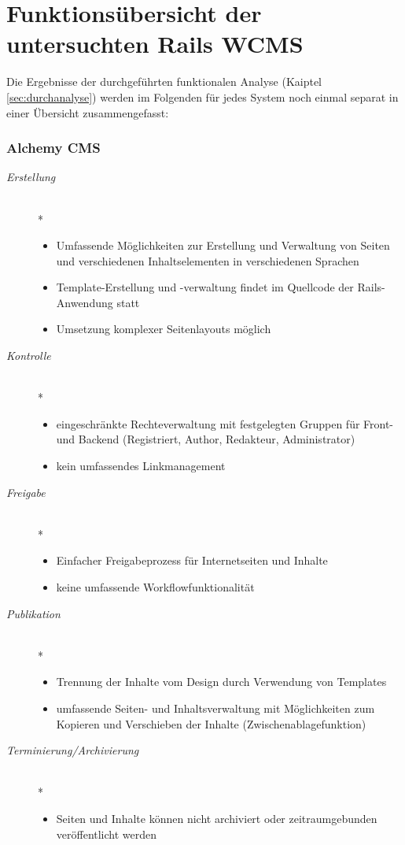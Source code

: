 \section{Funktionsübersicht der untersuchten Rails WCMS}
Die Ergebnisse der durchgeführten funktionalen Analyse (Kaiptel \ref{sec:durchanalyse}) werden im Folgenden für jedes System noch einmal separat in einer Übersicht zusammengefasst:


\subsubsection{Alchemy CMS}

\begin{description}
\item[\emph{Erstellung}]\mbox{~}\\*
\begin{itemize}
	\item Umfassende Möglichkeiten zur Erstellung und Verwaltung von Seiten und verschiedenen Inhaltselementen in verschiedenen Sprachen
	\item Template-Erstellung und -verwaltung findet im Quellcode der Rails-Anwendung statt
	\item Umsetzung komplexer Seitenlayouts möglich
\end{itemize}
\item[\emph{Kontrolle}]\mbox{~}\\*
\begin{itemize}
	\item eingeschränkte Rechteverwaltung mit festgelegten Gruppen für Front- und Backend (Registriert, Author, Redakteur, Administrator)
	\item kein umfassendes Linkmanagement
\end{itemize}
\item[\emph{Freigabe}]\mbox{~}\\*
\begin{itemize}
	\item Einfacher Freigabeprozess für Internetseiten und Inhalte
	\item keine umfassende Workflowfunktionalität
\end{itemize}
\item[\emph{Publikation}]\mbox{~}\\*
\begin{itemize}
	\item Trennung der Inhalte vom Design durch Verwendung von Templates
	\item umfassende Seiten- und Inhaltsverwaltung mit Möglichkeiten zum Kopieren und Verschieben der Inhalte (Zwischenablagefunktion)
\end{itemize}
\item[\emph{Terminierung/Archivierung}]\mbox{~}\\*
\begin{itemize}
	\item Seiten und Inhalte können nicht archiviert oder zeitraumgebunden veröffentlicht werden
\end{itemize}
\end{description}

